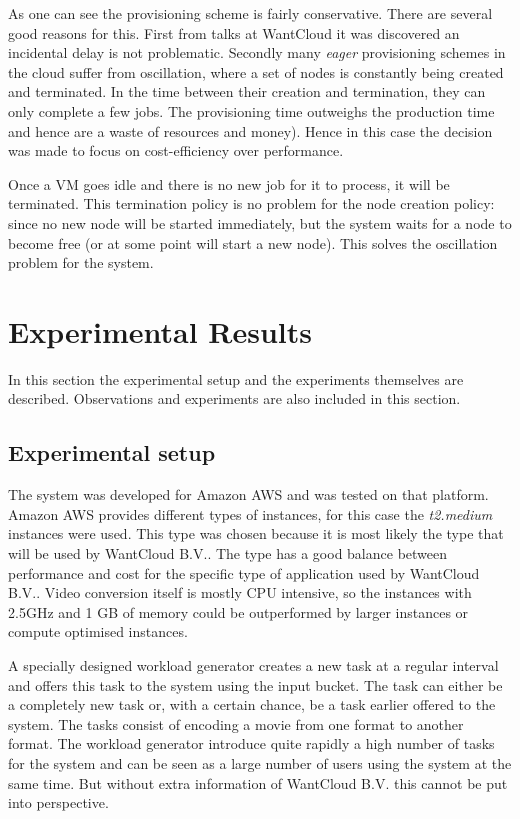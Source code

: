 \documentclass[a4paper]{IEEEtran}
\begin{document}
As one can see the provisioning scheme is fairly conservative.
There are several good reasons for this.
First from talks at WantCloud it was discovered an incidental delay is not problematic.
Secondly many \textit{eager} provisioning schemes in the cloud suffer from oscillation, where a set of nodes is constantly being created and terminated.
In the time between their creation and termination, they can only complete a few jobs.
The provisioning time outweighs the production time and hence are a waste of resources and money).
Hence in this case the decision was made to focus on cost-efficiency over performance.

Once a VM goes idle and there is no new job for it to process, it will be terminated.
This termination policy is no problem for the node creation policy: since no new node will be started immediately, but the system waits for a node to become free (or at some point will start a new node). 
This solves the oscillation problem for the system.

\section{Experimental Results}
In this section the experimental setup and the experiments themselves are described.
Observations and experiments are also included in this section.

\subsection{Experimental setup}

The system was developed for Amazon AWS and was tested on that platform.
Amazon AWS provides different types of instances, for this case the \emph{t2.medium} instances were used.
This type was chosen because it is most likely the type that will be used by WantCloud B.V..
The type has a good balance between performance and cost for the specific type of application used by WantCloud B.V..
Video conversion itself is mostly CPU intensive, so the instances with 2.5GHz and 1 GB of memory could be outperformed by larger instances or compute optimised instances.

A specially designed workload generator creates a new task at a regular interval and offers this task to the system using the input bucket.
The task can either be a completely new task or, with a certain chance, be a task earlier offered to the system.
The tasks consist of encoding a movie from one format to another format.
The workload generator introduce quite rapidly a high number of tasks for the system
and can be seen as a large number of users using the system at the same time.
But without extra information of WantCloud B.V. this cannot be put into perspective.
\end{document}
